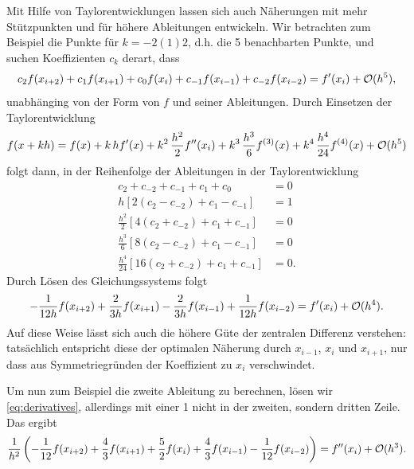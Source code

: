 Mit Hilfe von Taylorentwicklungen lassen sich auch Näherungen mit mehr
Stützpunkten und für höhere Ableitungen entwickeln.  Wir betrachten
zum Beispiel die Punkte für $k=-2(1)2$, d.h. die 5 benachbarten
Punkte, und suchen Koeffizienten $c_k$ derart, dass
\begin{equation}
  c_2 f(x_{i+2}) + c_1 f(x_{i+1})  + c_0 f(x_i) + c_{-1}f(x_{i-1}) +
  c_{-2}f(x_{i-2}) = f'(x_i) + \mathcal O(h^5),
\end{equation}
unabhänging von der Form von $f$ und seiner Ableitungen.  Durch
Einsetzen der Taylorentwicklung
\begin{equation}
  f(x + k h) = f(x) + k\, hf'(x) + k^2\,\frac{h^2}{2} f''(x_i) +
  k^3\,\frac{h^3}{6}f^{(3)}(x) + k^4\,\frac{h^4}{24}f^{(4)}(x) + \mathcal O(h^5)
\end{equation}
folgt dann, in der Reihenfolge der Ableitungen in der Taylorentwicklung
\begin{align}
  \label{eq:derivatives}
  c_{2} + c_{-2} + c_{-1} + c_1 + c_0 &= 0\nonumber\\
  h\left[2 (c_{2} - c_{-2})  + c_{1} - c_{-1}\right] &= 1\nonumber\\
  \frac{h^2}{2}\left[4(c_{2} + c_{-2})  + c_{1} + c_{-1}\right] &= 0\nonumber\\
  \frac{h^3}{6}\left[8 (c_{2} - c_{-2})  + c_{1} - c_{-1}\right] &= 0\nonumber\\
  \frac{h^4}{24}\left[16 (c_{2} + c_{-2}) + c_{1} + c_{-1}\right] &= 0.
\end{align}
Durch Lösen des Gleichungssystems folgt
\begin{equation}
  \label{eq:4orderdiff}
  -\frac{1}{12h} f(x_{i+2}) + \frac{2}{3h} f(x_{i+1})  - \frac{2}{3h} f(x_{i-1}) +
  \frac{1}{12h}f(x_{i-2}) = f'(x_i) + \mathcal O(h^4).
\end{equation}
Auf diese Weise lässt sich auch die höhere Güte der zentralen
Differenz verstehen: tatsächlich entspricht diese der optimalen
Näherung durch $x_{i-1}$, $x_i$  und $x_{i+1}$, nur dass aus
Symmetriegründen der Koeffizient zu $x_i$ verschwindet.

Um nun zum Beispiel die zweite Ableitung zu berechnen, lösen wir
\eqref{eq:derivatives}, allerdings mit einer 1 nicht in der zweiten,
sondern dritten Zeile. Das ergibt
\begin{equation}
  \label{eq:3order2diff}
  \frac{1}{h^2}\left(-\frac{1}{12} f(x_{i+2}) + \frac{4}{3} f(x_{i+1}) +
  \frac{5}{2} f(x_i)  + \frac{4}{3} f(x_{i-1}) -
  \frac{1}{12}f(x_{i-2})\right) = f''(x_i) + \mathcal O(h^3).
\end{equation}

